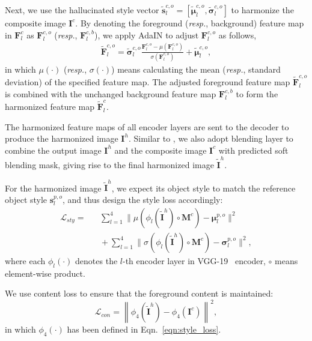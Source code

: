 \documentclass[letterpaper]{article} %
\begin{document}
Next, we use the hallucinated style vector $\tilde{\bm{s}}^{c,o}_l=[\tilde{\bm{\mu}}^{c,o}_l, \tilde{\bm{\sigma}}^{c,o}_l]$ to harmonize the composite image  $\bm{I}^c$. By denoting the foreground (\emph{resp.}, background) feature map in $\bm{F}_l^c$ as $\bm{F}^{c,o}_l$ (\emph{resp.}, $\bm{F}^{c,b}_l$), we apply AdaIN to adjust $\bm{F}^{c,o}_l$ as follows,
\begin{eqnarray}\label{eqn:adain}
    \tilde{\bm{F}}^{c,o}_{l} = \tilde{\bm{\sigma}}^{c,o}_l\frac{\bm{F}^{c,o}_l-\mu(\bm{F}^{c,o}_l)}{\sigma(\bm{F}^{c,o}_l)} + \tilde{\bm{\mu}}^{c,o}_l,
\end{eqnarray}
in which $\mu(\cdot)$ (\emph{resp.}, $\sigma(\cdot)$) means calculating the mean (\emph{resp.}, standard deviation) of the specified feature map. The adjusted foreground feature map $\tilde{\bm{F}}^{c,o}_{l}$ is combined with the unchanged background feature map $\bm{F}^{c,b}_l$ to form the harmonized feature map $\tilde{\bm{F}}^{c}_{l}$.

The harmonized feature maps of all encoder layers are sent to the decoder to produce the harmonized image $\bm{I}^h$. Similar to \cite{cao2022painterly}, we also adopt blending layer to combine the output image $\bm{I}^h$ and the composite image $\bm{I}^c$ with predicted soft blending mask, giving rise to the final harmonized image $\tilde{\bm{I}}^h$.

For the harmonized image $\tilde{\bm{I}}^h$, we expect its object style to match the reference object style $\bm{s}^{p,o}_l$, and thus design the style loss accordingly:
\begin{eqnarray}\label{eqn:style_loss}
\mathcal{L}_{sty} =\!\!\!\!\!\!\!\!\!\!\!\!&&\sum_{l=1}^{4}\|\mu\left(\phi_{l}(\tilde{\bm{I}}^h)\circ \bm{M}^c\right)-\bm{\mu}^{p,o}_l \|^2 \nonumber\\
&&\!\!\!\!\!\!\!\!\!\!\!\!+ \sum_{l=1}^{4}\|\sigma\left(\phi_{l}(\tilde{\bm{I}}^h)\circ \bm{M}^c\right)-\bm{\sigma}^{p,o}_l \|^2,
\end{eqnarray}
where each $\phi_{l}(\cdot)$ denotes the $l$-th encoder layer in VGG-19~\cite{VGG19} encoder, $\circ$ means element-wise product.

We use content loss \cite{gatys2016image} to ensure that the foreground content is maintained:
\begin{equation}\label{eqn:content_loss}
    \mathcal{L}_{con} =\left\|\phi_4(\tilde{\bm{I}}^h)-\phi_4(\bm{I}^c)\right\|^2,
\end{equation}
in which $\phi_{4}(\cdot)$ has been defined in Eqn.~\ref{eqn:style_loss}.
\end{document}
